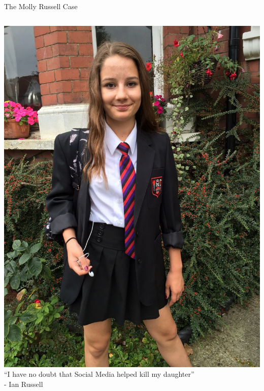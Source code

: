 \documentclass[nobackground,dvipsnames,table]{beamer}
\begin{document}
\begin{frame}{The Molly Russell Case}
    \begin{columns}
            \includegraphics[width=\textwidth]{molly-russell}
            \centering
            \large
            “I have no doubt that Social Media helped kill my daughter”\\
            - Ian Russell
    \end{columns}
\end{frame}
\end{document}
